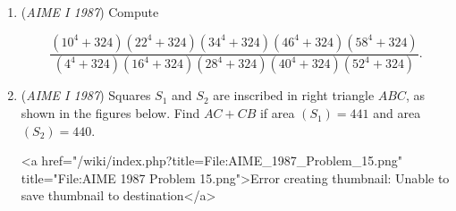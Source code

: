 \begin{enumerate}
 The example below shows how the sequence 1, 9, 8, 7 is transformed into the sequence 1, 8, 7, 9 by one bubble pass.  The numbers compared at each step are underlined.


 $\underline{1 \quad 9} \quad 8 \quad 7$
$1 \quad {}\underline{9 \quad 8} \quad 7$
$1 \quad 8 \quad \underline{9 \quad 7}$
$1 \quad 8 \quad 7 \quad 9$

 Suppose that $n = 40$, and that the terms of the initial sequence $r_1, r_2, \dots, r_{40}$ are distinct from one another and are in random order.  Let $p/q$, in lowest terms, be the probability that the number that begins as $r_{20}$ will end up, after one bubble pass, in the $30^{\mbox{th}}$ place.  Find $p + q$.


 

	\item (\textit{AIME I 1987}) Compute

 \[\frac{(10^4+324)(22^4+324)(34^4+324)(46^4+324)(58^4+324)}{(4^4+324)(16^4+324)(28^4+324)(40^4+324)(52^4+324)}.\]


	\item (\textit{AIME I 1987}) Squares $S_1$ and $S_2$ are inscribed in right triangle $ABC$, as shown in the figures below. Find $AC + CB$ if area $(S_1) = 441$ and area $(S_2) = 440$.


 <a href="/wiki/index.php?title=File:AIME\_1987\_Problem\_15.png" title="File:AIME 1987 Problem 15.png">Error creating thumbnail: Unable to save thumbnail to destination</a>


\end{enumerate}